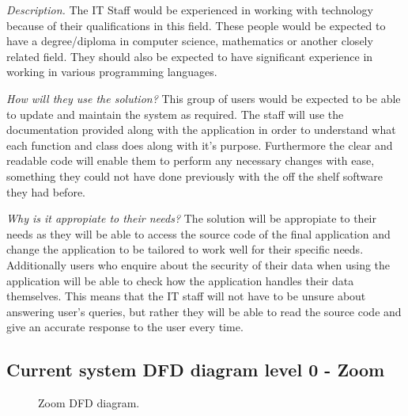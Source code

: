 \textit{Description.}
The IT Staff would be experienced in working with technology
because of their qualifications in this field. These people 
would be expected to have a degree/diploma in computer science,
mathematics or another closely related field. They should also 
be expected to have significant experience in working in 
various programming languages. \vspace{0.2cm}

\textit{How will they use the solution?}
This group of users would be expected to be able to update and
maintain the system as required. The staff will use the
documentation provided along with the application in order to
understand what each function and class does along with it's
purpose. Furthermore the clear and readable code will enable
them to perform any necessary changes with ease, something
they could not have done previously with the off the shelf
software they had before. \vspace{0.2cm}

\textit{Why is it appropiate to their needs?}
The solution will be appropiate to their needs as they will be
able to access the source code of the final application and 
change the application to be tailored to work well for their 
specific needs. Additionally users who enquire about the 
security of their data when using the application will be able
to check how the application handles their data themselves.
This means that the IT staff will not have to be unsure about
answering user's queries, but rather they will be able to read
the source code and give an accurate response to the user every
time.

\subsection{Current system DFD diagram level 0 - Zoom}


\begin{figure}[h]
\label{fig:dfd}
\centering
{}

\caption{Zoom DFD diagram.}
\end{figure}

